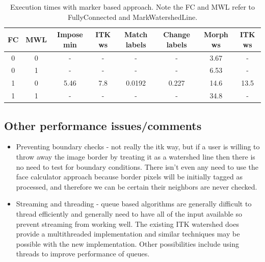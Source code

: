 \documentclass{InsightArticle}
\begin{document}
\begin{table}[htbp]
\centering
\begin{tabular}{cc|cccc|cc}
\hline
FC & MWL & Impose min &  ITK ws & Match labels & Change labels & Morph ws & ITK ws \\
\hline
\hline
0 &      0 &      -    &   -   &    -      & -     &  3.67 &   - \\
0 &      1 &      -    &   -   &    -      & -     &  6.53 &   - \\
1 &      0 &      5.46 &   7.8 &    0.0192 & 0.227 &  14.6 &   13.5 \\
1 &      1 &      -    &   -   &    -      & -     &  34.8 &   - \\
\hline
\end{tabular}
\caption{Execution times with marker based approach. Note the FC and MWL refer to FullyConnected and MarkWatershedLine.\label{tbl:perf-marker}}
\end{table}

\subsection{Other performance issues/comments}
\begin{itemize}
\item Preventing boundary checks - not really the itk way, but if a user is
willing to throw away the image border by treating it as a watershed
line then there is no need to test for boundary conditions. There
isn't even any need to use the face calculator approach because border
pixels will be initially tagged as processed, and therefore we can be
certain their neighbors are never checked.
\item Streaming and threading  - queue based algorithms are generally difficult 
to thread efficiently and generally need to have all of the input
available so prevent streaming from working well. The existing ITK
watershed does provide a multithreaded implementation and similar
techniques may be possible with the new implementation. Other
possibilities include using threads to improve performance of queues.
\end{itemize}
\end{document}
